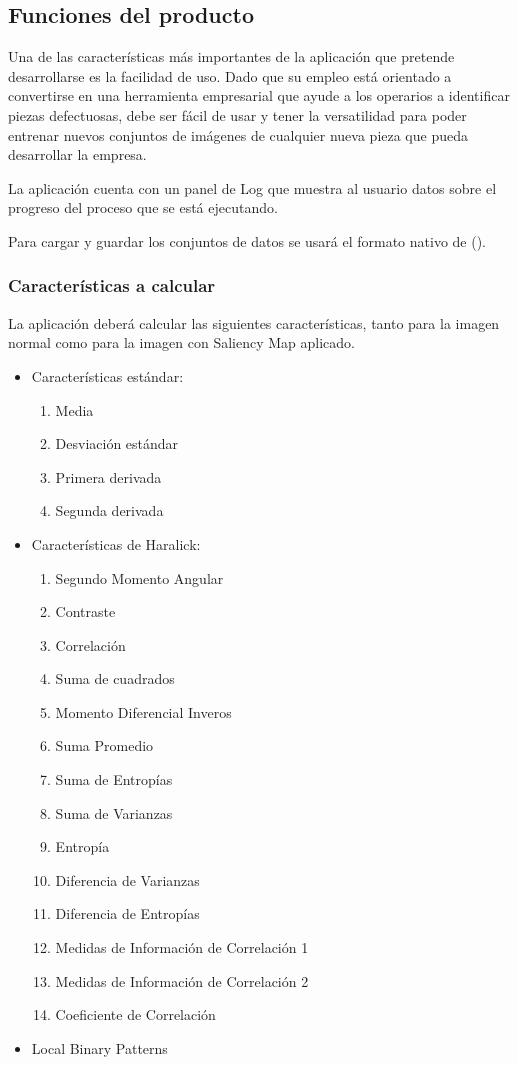 \subsection{Funciones del producto}
Una de las características más importantes de la aplicación que pretende desarrollarse es la facilidad de uso. Dado que su empleo está orientado a convertirse en una herramienta empresarial que ayude a los operarios a identificar piezas defectuosas, debe ser fácil de usar y tener la versatilidad para poder entrenar nuevos conjuntos de imágenes de cualquier nueva pieza que pueda desarrollar la empresa.

La aplicación cuenta con un panel de Log que muestra al usuario datos sobre el progreso del proceso que se está ejecutando.

Para cargar y guardar los conjuntos de datos se usará el formato nativo de \weka{} (\arff{}).


\subsubsection{Características a calcular}
La aplicación deberá calcular las siguientes características, tanto para la imagen normal como para la imagen con Saliency Map aplicado.
\begin{itemize}
 \item Características estándar: 
 \begin{enumerate}
 \item Media
 \item Desviación estándar
 \item Primera derivada
 \item Segunda derivada
 \end{enumerate}
 \item Características de Haralick:
 \begin{enumerate}
 \item Segundo Momento Angular
 \item Contraste
 \item Correlación
 \item Suma de cuadrados
 \item Momento Diferencial Inveros
 \item Suma Promedio
 \item Suma de Entropías
 \item Suma de Varianzas
 \item Entropía
 \item Diferencia de Varianzas
 \item Diferencia de Entropías
 \item Medidas de Información de Correlación 1
 \item Medidas de Información de Correlación 2
 \item Coeficiente de Correlación
 \end{enumerate}
 \item Local Binary Patterns
\end{itemize}

